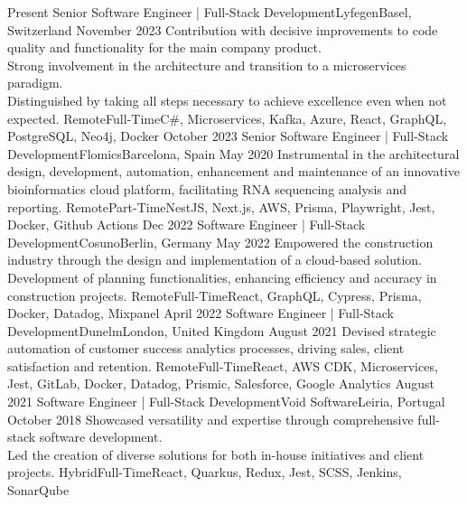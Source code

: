 %
%
%
\vspace{0.5em}
\begin{experiences}
  \experience
  {Present} {Senior Software Engineer | Full-Stack Development}{Lyfegen}{Basel, Switzerland}
  {November 2023}    {Contribution with decisive improvements to code quality and functionality for the main company product.\\
  Strong involvement in the architecture and transition to a microservices paradigm.\\
  Distinguished by taking all steps necessary to achieve excellence even when not expected.}
  {Remote}{Full-Time}{C\#, Microservices, Kafka, Azure, React, GraphQL, PostgreSQL, Neo4j, Docker} 
  \emptySeparator
  \experience
  {October 2023} {Senior Software Engineer | Full-Stack Development}{Flomics}{Barcelona, Spain}
  {May 2020}    {Instrumental in the architectural design, development, automation, enhancement and maintenance of an 
  innovative bioinformatics cloud platform, facilitating RNA sequencing analysis and reporting.}
  {Remote}{Part-Time}{NestJS, Next.js, AWS, Prisma, Playwright, Jest, Docker, Github Actions}
  \emptySeparator
  \experience
  {Dec 2022} {Software Engineer | Full-Stack Development}{Cosuno}{Berlin, Germany}
  {May 2022} {Empowered the construction industry through the design and implementation of a cloud-based 
  solution.\\
  Development of planning functionalities, enhancing efficiency 
  and accuracy in construction projects.}
  {Remote}{Full-Time}{React, GraphQL, Cypress, Prisma, Docker, Datadog, Mixpanel}
  \emptySeparator
  \experience
  {April 2022}   {Software Engineer | Full-Stack Development}{Dunelm}{London, United Kingdom}
  {August 2021} {Devised strategic automation of customer success analytics processes, driving sales,
  client satisfaction and retention.}
  {Remote}{Full-Time}{React,  AWS CDK, Microservices, Jest, GitLab, Docker, Datadog, Prismic, Salesforce, Google Analytics}
  \emptySeparator
  \experience
  {August 2021}     {Software Engineer | Full-Stack Development}{Void Software}{Leiria, Portugal}
  {October 2018}    {Showcased versatility and expertise through comprehensive full-stack software development.\\
  Led the creation of diverse solutions for both in-house initiatives and client projects.}
  {Hybrid}{Full-Time}{React, Quarkus, Redux, Jest, SCSS, Jenkins, SonarQube}
\end{experiences}